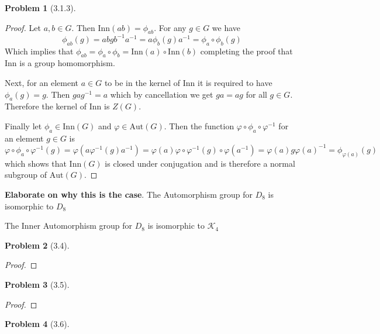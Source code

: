 \documentclass[10pt]{article}
\newcommand{\sk}{\vskip 10mm}
\theoremstyle{plain}
\newtheorem{problem}{Problem}
\theoremstyle{remark}
\begin{document}
\begin{problem}[3.1.3] %
  
\end{problem}

\begin{proof}
  Let $a,b\in G$. Then $\text{Inn}(ab)=\phi_{ab}$. For any $g\in G$ we have
  \[\phi_{ab}(g)=abgb^{-1}a^{-1}=a\phi_b(g)a^{-1}=\phi_a\circ\phi_b(g)\]
  Which implies that $\phi_{ab}=\phi_a\circ\phi_b=\text{Inn}(a)\circ\text{Inn}(b)$
  completing the proof that $\text{Inn}$ is a group homomorphism.

  Next, for an element $a\in G$ to be in the kernel of $\text{Inn}$
  it is required to have $\phi_a(g)=g$. Then
  $gag^{-1}=a$ which by cancellation we get $ga=ag$ for all $g\in G$.
  Therefore the kernel of $\text{Inn}$ is $Z(G)$.

  Finally let $\phi_a\in\text{Inn}(G)$ and $\varphi\in\text{Aut}(G)$. Then
  the function $\varphi\circ\phi_a\circ\varphi^{-1}$ for an element $g\in G$ is
  \[ \varphi\circ\phi_a\circ\varphi^{-1}(g)=\varphi(a\varphi^{-1}(g)a^{-1})=\varphi(a)\varphi\circ\varphi^{-1}(g)\circ\varphi(a^{-1})=\varphi(a)g\varphi(a)^{-1}=\phi_{\varphi(a)}(g) \]
  which shows that $\text{Inn}(G)$ is closed under conjugation and is therefore a
  normal subgroup of $\text{Aut}(G)$.
\end{proof}


\textbf{Elaborate on why this is the case}.
The Automorphism group for $D_8$ is isomorphic to $D_8$ 

The Inner Automorphism group for $D_8$ is isomorphic to $\mathcal{K}_4$

\sk

\begin{problem}[3.4] %
  
\end{problem}

\begin{proof}
  
\end{proof}

\sk

\begin{problem}[3.5] %
  
\end{problem}

\begin{proof}
  
\end{proof}

\sk

\begin{problem}[3.6] %
  
\end{problem}
\end{document}
